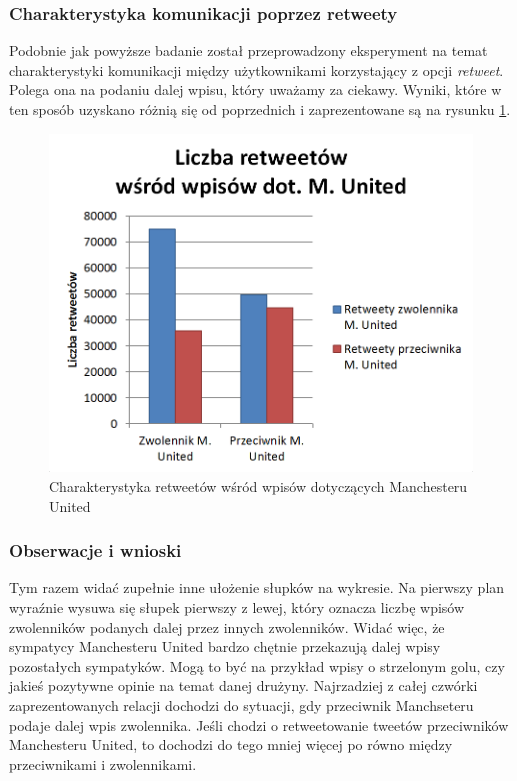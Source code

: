 \subsubsection{Charakterystyka komunikacji poprzez retweety}
Podobnie jak powyższe badanie został przeprowadzony eksperyment na temat 
charakterystyki komunikacji między użytkownikami korzystający z opcji 
\textit{retweet}. Polega ona na podaniu dalej wpisu, który uważamy za ciekawy.
Wyniki, które w ten sposób uzyskano różnią się od poprzednich i zaprezentowane
są na rysunku \ref{image:retweety-munited}.

\begin{figure}[ht!]
\centering
\includegraphics[width=120mm]{img/retweety-munited.png}
\caption{Charakterystyka retweetów wśród wpisów dotyczących Manchesteru United}
\label{image:retweety-munited}
\end{figure}



\subsubsection{Obserwacje i wnioski}
Tym razem widać zupełnie inne ułożenie słupków na wykresie.
Na pierwszy plan wyraźnie wysuwa się słupek pierwszy z lewej, który oznacza
liczbę wpisów zwolenników podanych dalej przez innych zwolenników. Widać więc,
że sympatycy Manchesteru United bardzo chętnie przekazują dalej wpisy 
pozostałych sympatyków. Mogą to być na przykład wpisy o strzelonym golu,
czy jakieś pozytywne opinie na temat danej drużyny. Najrzadziej z całej
czwórki zaprezentowanych relacji dochodzi do sytuacji, gdy przeciwnik
Manchseteru podaje dalej wpis zwolennika. Jeśli chodzi o retweetowanie
tweetów przeciwników Manchesteru United, to dochodzi do tego mniej więcej po
równo między przeciwnikami i zwolennikami.

